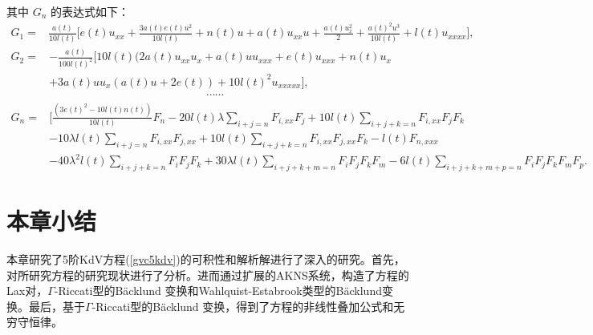 其中 $G_n$ 的表达式如下：
\begin{align}
G_1=& \frac{a(t)}{10 l(t)}\big[ e(t) u_{xx}+\frac{3 a(t) e(t) u^2}{10 l(t)}+ n(t) u +a(t) u_{xx} u+\frac{a(t) u_x^2}{2}+\frac{a(t)^2 u^3}{10 l(t)}+ l(t) u_{xxxx} \big],
\end{align}
\begin{align}
\nonumber
G_2=& -\frac{a(t)}{100 l(t)^2}\big[ 10 l(t) (2 a(t) u_{xx} u_x+a(t) u u_{xxx}+e(t) u_{xxx}+n(t) u_x
\\ &+3 a(t) u u_x (a(t) u+2 e(t)) +10 l(t)^2 u_{xxxxx} \big],
\\ \nonumber
& \quad\quad\quad\quad\quad\quad\quad\quad\quad\quad\quad\quad\quad\quad \cdots\cdots
\\ \nonumber
G_n= & \big[\frac{ (3 e(t)^2-10 l(t) n(t))}{10 l(t)}F_n -20 l(t) \lambda \sum_{i+j=n} F_{i,xx} F_j
+ 10 l(t) \sum_{i+j+k=n} F_{i,xx} F_j F_k
\\ \nonumber
& -10 \lambda l(t)  \sum_{i+j=n} F_{i,xx} F_{j,xx}+ 10 l(t) \sum_{i+j+k=n} F_{i,xx} F_{j,xx} F_k - l(t) F_{n,xxx}
\\
& - 40  \lambda^2 l(t) \sum_{i+j+k=n} F_{i} F_j F_k +30 \lambda l(t) \sum_{i+j+k+m=n} F_{i} F_{j} F_k F_m-6 l(t) \sum_{i+j+k+m+p=n} F_{i} F_{j} F_k F_m F_p.
\end{align}

\section{本章小结}
本章研究了5阶KdV方程(\ref{gvc5kdv})的可积性和解析解进行了深入的研究。首先，对所研究方程的研究现状进行了分析。进而通过扩展的AKNS系统，构造了方程的Lax对，$\Gamma$-Riccati型的B\"{a}cklund 变换和Wahlquist-Estabrook类型的B\"{a}cklund变换。最后，基于$\Gamma$-Riccati型的B\"{a}cklund 变换，得到了方程的非线性叠加公式和无穷守恒律。
